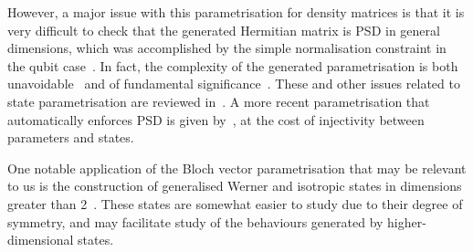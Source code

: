 \documentclass[10pt, a4paper]{article}
\numberwithin{equation}{section} %
\theoremstyle{definition}
\theoremstyle{plain}
\newcommand{\?}{\mathrel{?}} %
\begin{document}
\begin{appendices}
                    However, a major issue with this parametrisation for density matrices is that it is very difficult to check that the generated Hermitian matrix is PSD in general dimensions, which was accomplished by the simple normalisation constraint in the qubit case~\cite{DensMatParam}. In fact, the complexity of the generated parametrisation is both unavoidable~\cite{NoHigherEuclideanRepr} and of fundamental significance~\cite{InfoAsymStateSpace}. These and other issues related to state parametrisation are reviewed in~\cite{DensMatParam}. A more recent parametrisation that automatically enforces PSD is given by~\cite{SquaringParam}, at the cost of injectivity between parameters and states.

                    One notable application of the Bloch vector parametrisation that may be relevant to us is the construction of generalised Werner and isotropic states in dimensions greater than 2~\cite{WernerIsotropicDecomp}. These states are somewhat easier to study due to their degree of symmetry, and may facilitate study of the behaviours generated by higher-dimensional states. 

                  \end{appendices}

                  
\end{document}
